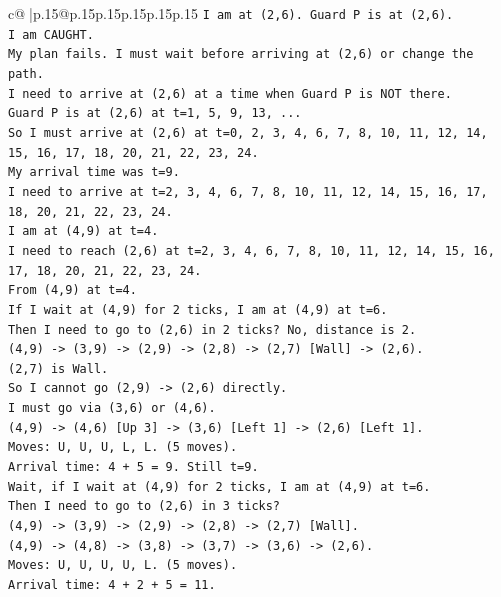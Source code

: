 \documentclass{article}
\begin{document}
{\begin{supertabular}{c@{$\;$}|p{.15\linewidth}@{}p{.15\linewidth}p{.15\linewidth}p{.15\linewidth}p{.15\linewidth}p{.15\linewidth}}
{{{\texttt{I am at (2,6). Guard P is at (2,6).} \\
\texttt{I am CAUGHT.} \\
\texttt{My plan fails. I must wait before arriving at (2,6) or change the path.} \\
\texttt{I need to arrive at (2,6) at a time when Guard P is NOT there.} \\
\texttt{Guard P is at (2,6) at t=1, 5, 9, 13, ...} \\
\texttt{So I must arrive at (2,6) at t=0, 2, 3, 4, 6, 7, 8, 10, 11, 12, 14, 15, 16, 17, 18, 20, 21, 22, 23, 24.} \\
\texttt{My arrival time was t=9.} \\
\texttt{I need to arrive at t=2, 3, 4, 6, 7, 8, 10, 11, 12, 14, 15, 16, 17, 18, 20, 21, 22, 23, 24.} \\
\texttt{I am at (4,9) at t=4.} \\
\texttt{I need to reach (2,6) at t=2, 3, 4, 6, 7, 8, 10, 11, 12, 14, 15, 16, 17, 18, 20, 21, 22, 23, 24.} \\
\texttt{From (4,9) at t=4.} \\
\texttt{If I wait at (4,9) for 2 ticks, I am at (4,9) at t=6.} \\
\texttt{Then I need to go to (2,6) in 2 ticks? No, distance is 2.} \\
\texttt{(4,9) {-}> (3,9) {-}> (2,9) {-}> (2,8) {-}> (2,7) {[}Wall{]} {-}> (2,6).} \\
\texttt{(2,7) is Wall.} \\
\texttt{So I cannot go (2,9) {-}> (2,6) directly.} \\
\texttt{I must go via (3,6) or (4,6).} \\
\texttt{(4,9) {-}> (4,6) {[}Up 3{]} {-}> (3,6) {[}Left 1{]} {-}> (2,6) {[}Left 1{]}.} \\
\texttt{Moves: U, U, U, L, L. (5 moves).} \\
\texttt{Arrival time: 4 + 5 = 9. Still t=9.} \\
\texttt{Wait, if I wait at (4,9) for 2 ticks, I am at (4,9) at t=6.} \\
\texttt{Then I need to go to (2,6) in 3 ticks?} \\
\texttt{(4,9) {-}> (3,9) {-}> (2,9) {-}> (2,8) {-}> (2,7) {[}Wall{]}.} \\
\texttt{(4,9) {-}> (4,8) {-}> (3,8) {-}> (3,7) {-}> (3,6) {-}> (2,6).} \\
\texttt{Moves: U, U, U, U, L. (5 moves).} \\
\texttt{Arrival time: 4 + 2 + 5 = 11.} \\
}}}
\end{supertabular}}
\end{document}
